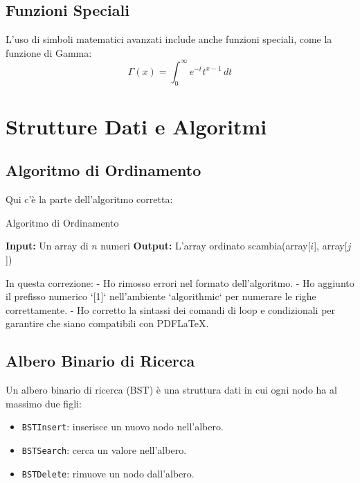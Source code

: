 \documentclass[12pt]{article}
\begin{document}
\subsection{Funzioni Speciali}
L'uso di simboli matematici avanzati include anche funzioni speciali, come la funzione di Gamma:
\begin{equation}
    \Gamma(x) = \int_{0}^{\infty} e^{-t} t^{x-1} \, dt
\end{equation}

\section{Strutture Dati e Algoritmi}
\subsection{Algoritmo di Ordinamento}
Qui c'è la parte dell'algoritmo corretta:

\begin{algorithm}
\caption{Algoritmo di Ordinamento}
\begin{algorithmic}[1]
\State \textbf{Input:} Un array di $n$ numeri
\State \textbf{Output:} L'array ordinato
            \State scambia(array[$i$], array[$j$])
        \EndIf
    \EndFor
\EndFor
\end{algorithmic}
\end{algorithm}

In questa correzione:
- Ho rimosso errori nel formato dell'algoritmo.
- Ho aggiunto il prefisso numerico `[1]` nell'ambiente `algorithmic` per numerare le righe correttamente.
- Ho corretto la sintassi dei comandi di loop e condizionali per garantire che siano compatibili con PDFLaTeX.

\subsection{Albero Binario di Ricerca}
Un albero binario di ricerca (BST) è una struttura dati in cui ogni nodo ha al massimo due figli:
\begin{itemize}
    \item \texttt{BSTInsert}: inserisce un nuovo nodo nell'albero.
    \item \texttt{BSTSearch}: cerca un valore nell'albero.
    \item \texttt{BSTDelete}: rimuove un nodo dall'albero.
\end{itemize}
\end{document}

